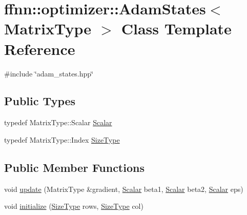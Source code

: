 \hypertarget{classffnn_1_1optimizer_1_1_adam_states}{\section{ffnn\-:\-:optimizer\-:\-:Adam\-States$<$ Matrix\-Type $>$ Class Template Reference}
\label{classffnn_1_1optimizer_1_1_adam_states}
}


{\ttfamily \#include \char`\"{}adam\-\_\-states.\-hpp\char`\"{}}

\subsection*{Public Types}
\begin{DoxyCompactItemize}
\item 
typedef Matrix\-Type\-::\-Scalar \hyperlink{classffnn_1_1optimizer_1_1_adam_states_a5ff656035aff83f1e06140d556e21977}{Scalar}
\item 
typedef Matrix\-Type\-::\-Index \hyperlink{classffnn_1_1optimizer_1_1_adam_states_a02c5c9a4b2a5689061570f493e842f0b}{Size\-Type}
\end{DoxyCompactItemize}
\subsection*{Public Member Functions}
\begin{DoxyCompactItemize}
\item 
void \hyperlink{classffnn_1_1optimizer_1_1_adam_states_a3c5963e78d7cca8c7c7a81d9034c5c27}{update} (Matrix\-Type \&gradient, \hyperlink{classffnn_1_1optimizer_1_1_adam_states_a5ff656035aff83f1e06140d556e21977}{Scalar} beta1, \hyperlink{classffnn_1_1optimizer_1_1_adam_states_a5ff656035aff83f1e06140d556e21977}{Scalar} beta2, \hyperlink{classffnn_1_1optimizer_1_1_adam_states_a5ff656035aff83f1e06140d556e21977}{Scalar} eps)
\item 
void \hyperlink{classffnn_1_1optimizer_1_1_adam_states_a37cb508c7d60d1df86cab12254596055}{initialize} (\hyperlink{classffnn_1_1optimizer_1_1_adam_states_a02c5c9a4b2a5689061570f493e842f0b}{Size\-Type} rows, \hyperlink{classffnn_1_1optimizer_1_1_adam_states_a02c5c9a4b2a5689061570f493e842f0b}{Size\-Type} col)
\end{DoxyCompactItemize}


